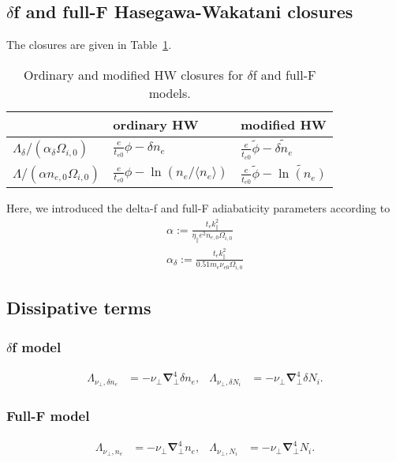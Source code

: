 \documentclass{hitec} %
\renewcommand{\vec}[1]{\boldsymbol{#1}}
\begin{document}
\subsection{\(\delta\)f and full-F Hasegawa-Wakatani closures}
The closures are given in Table~\ref{table:hwmhwtable}.
\begin{table}[!htp]
\centering
 \caption{Ordinary and modified HW closures for \(\delta\)f and full-F models.}
 \label{table:hwmhwtable}
\begin{tabular}{ l  l  l }
   & ordinary HW &  modified HW \\
     \hline			
  \(\Lambda_\delta/(\alpha_\delta \Omega_{i,0})\) & \( \frac{e}{t_{e0}}\phi-\delta n_e \) & \(  \frac{e}{t_{e0}}\widetilde{\phi}- \widetilde{ \delta n_e}\)\\
 \({\Lambda}/(\alpha n_{e,0} \Omega_{i,0})\) & \( \frac{e}{t_{e0}}\phi -\ln\left(n_e/\langle{  n_e }\rangle\right)  \)          & \( \frac{e}{t_{e0}} \widetilde{\phi}-\widetilde{\ln\left(n_e\right)}\)  \\
\end{tabular}
\end{table}
Here, we introduced the delta-f and full-F adiabaticity parameters according to
\begin{align}
\alpha:= \frac{ t_{e}  k_\parallel^2 }{ \eta_\parallel e^2   n_{e,0} \Omega_{i,0} } \\
 \alpha_\delta := \frac{t_e k_\parallel^2 }{0.51 m_e \nu_{e0} \Omega_{i,0}} 
\end{align}
\subsection{Dissipative terms}
\subsubsection{\(\delta\)f model}
\begin{align}\label{eq:perpdiffn}
 \Lambda_{\nu_\perp,\delta n_e} &=  -\nu_\perp \vec{\nabla}_\perp^4 \delta n_e, &
 \Lambda_{\nu_\perp,\delta N_i} &=  -\nu_\perp \vec{\nabla}_\perp^4 \delta  N_i.
\end{align}
\subsubsection{Full-F model}
\begin{align}\label{eq:perpdiffn}
 \Lambda_{\nu_\perp,n_e} &=  -\nu_\perp \vec{\nabla}_\perp^4 n_e, &
 \Lambda_{\nu_\perp,N_i} &=  -\nu_\perp \vec{\nabla}_\perp^4 N_i.
\end{align}
\end{document}
